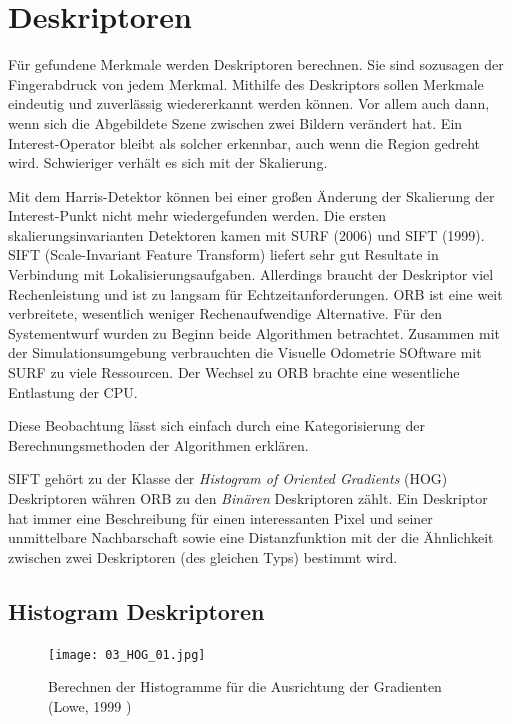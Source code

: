 \section{Deskriptoren}
Für gefundene Merkmale werden Deskriptoren berechnen. Sie sind sozusagen der Fingerabdruck von jedem Merkmal. Mithilfe des Deskriptors sollen Merkmale eindeutig und zuverlässig wiedererkannt werden können. Vor allem auch dann, wenn sich die Abgebildete Szene zwischen zwei Bildern verändert hat. Ein Interest-Operator bleibt als solcher erkennbar, auch wenn die Region gedreht wird. Schwieriger verhält es sich mit der Skalierung. 
\newline

Mit dem Harris-Detektor können bei einer gro{\ss}en Änderung der Skalierung der Interest-Punkt nicht mehr wiedergefunden werden. Die ersten skalierungsinvarianten Detektoren kamen mit SURF (2006) und SIFT (1999). SIFT (Scale-Invariant Feature Transform) liefert sehr gut Resultate in Verbindung mit Lokalisierungsaufgaben. Allerdings braucht der Deskriptor viel Rechenleistung und ist zu langsam für Echtzeitanforderungen. ORB ist eine weit verbreitete, wesentlich weniger Rechenaufwendige Alternative. Für den Systementwurf wurden zu Beginn beide Algorithmen betrachtet. Zusammen mit der Simulationsumgebung verbrauchten die Visuelle Odometrie SOftware mit SURF zu viele Ressourcen. Der Wechsel zu ORB brachte eine wesentliche Entlastung der CPU.
\newline 

Diese Beobachtung lässt sich einfach durch eine Kategorisierung der Berechnungsmethoden der Algorithmen erklären.

SIFT gehört zu der Klasse der \textit{Histogram of Oriented Gradients} (HOG) Deskriptoren währen ORB zu den \textit{Binären} Deskriptoren zählt. Ein Deskriptor hat immer eine Beschreibung für einen interessanten Pixel und seiner unmittelbare Nachbarschaft  sowie eine Distanzfunktion mit der die Ähnlichkeit zwischen zwei Deskriptoren (des gleichen Typs) bestimmt wird.

\subsection{Histogram Deskriptoren}
\begin{figure}[!ht]
  \centering
  \texttt{[image: 03\_HOG\_01.jpg]}
  \caption[Histogram Deskriptor aus Gradienten]{Berechnen der Histogramme für die Ausrichtung der Gradienten (Lowe, 1999 \cite{SIFT})}
\end{figure}

